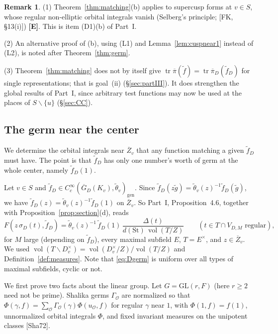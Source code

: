 \documentclass[12pt]{article}
\newcommand{\ov}[1]{\overline{#1}}
\newcommand{\gen}{\mathrm{gen}}
\newcommand{\tr}{\operatorname{tr}}
\newcommand{\vol}{\operatorname{vol}}
\newcommand{\GL}{\mathrm{GL}}
\newcommand{\St}{\mathrm{St}}
\newcommand{\Zb}{\ov{Z}}
\newcommand{\GDb}{\ov{G}_D}
\newcommand{\pib}{\ov{\pi}}
\newcommand{\sg}{\sigma}
\newcommand{\Ev}{\textbf{[E]}}
\theoremstyle{plain}
\theoremstyle{definition}
\newtheorem{remark}[theorem]{Remark}
\begin{document}
\begin{remark}
(1) Theorem~\ref{thm:matching}(b) applies to supercusp forms at $v\in S$, whose regular non-elliptic orbital integrals vanish (Selberg's principle; [FK, \S13(i)]) \Ev. This is item (D1)(b) of Part~I.

(2) An alternative proof of (b), using (L1) and Lemma~\ref{lem:cuspnear1} instead of (L2), is noted after Theorem~\ref{thm:germ}.

(3) Theorem~\ref{thm:matching} does not by itself give $\tr\pib(\tilde f)=\tr\pib_D(\tilde f_D)$ for single representations; that is goal~(ii) (\S\ref{sec:partIII}). It does strengthen the global results of Part~I, since arbitrary test functions may now be used at the places of $S\smallsetminus\{u\}$ (\S\ref{sec:CC}).
\end{remark}


\subsection{The germ near the center}\label{subsec:germ}
We determine the orbital integrals near $\Zb_v$ that any function matching a given $\tilde f_D$ must have. The point is that $\tilde f_D$ has only one number's worth of germ at the whole center, namely $\tilde f_D(1)$.

Let $v\in S$ and $\tilde f_D\in C_c^\infty(\GDb(K_v),\tilde\theta_v)_\gen$. Since $\tilde f_D(z\tilde g)=\tilde\theta_v(z)^{-1}\tilde f_D(\tilde g)$, we have $\tilde f_D(z)=\tilde\theta_v(z)^{-1}\tilde f_D(1)$ on $\Zb_v$. So Part~I, Proposition~4.6, together with Proposition~\ref{prop:section}(d), reads
\begin{equation}\label{eq:Dgerm}
F(z\,\sg_D(t),\tilde f_D)=\tilde\theta_v(z)^{-1}\,\tilde f_D(1)\,\frac{\Delta(t)}{d(\St)\,\vol(T/Z)}\qquad(t\in T\cap V_{D,M}\text{ regular}),
\end{equation}
for $M$ large (depending on $\tilde f_D$), every maximal subfield $E$, $T=E^\times$, and $z\in\Zb_v$. We used $\vol(T\backslash D_v^\times)=\vol(D_v^\times/Z)/\vol(T/Z)$ and Definition~\ref{def:measures}. Note that \eqref{eq:Dgerm} is uniform over all types of maximal subfields, cyclic or not.


We first prove two facts about the linear group. Let $G=\GL(r,F)$ (here $r\ge2$ need not be prime). Shalika germs $\Gamma_{\mathcal O}$ are normalized so that $\Phi(\gamma,f)=\sum_{\mathcal O}\Gamma_{\mathcal O}(\gamma)\Phi(u_{\mathcal O},f)$ for regular $\gamma$ near $1$, with $\Phi(1,f)=f(1)$, unnormalized orbital integrals $\Phi$, and fixed invariant measures on the unipotent classes [Sha72].
\end{document}
